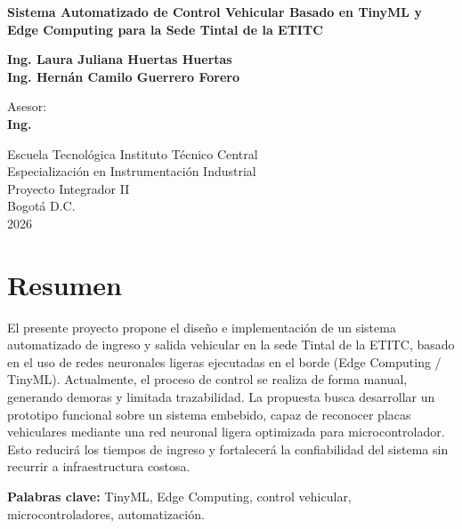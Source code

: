 \documentclass[12pt, letterpaper]{article}
\begin{document}
\begin{titlepage}
    \centering
    \vspace*{2cm}
    
    {\Large \textbf{Sistema Automatizado de Control Vehicular Basado en TinyML y Edge Computing para la Sede Tintal de la ETITC}\par}
    
    \vspace{4cm}
    
    {\large \textbf{Ing. Laura Juliana Huertas Huertas}\\
    \textbf{Ing. Hernán Camilo Guerrero Forero}\par}
    
    \vspace{3cm}
    
    {\large Asesor:\\
    \textbf{Ing. }\par}
    
    \vfill
    
    {\large Escuela Tecnológica Instituto Técnico Central\\
    Especialización en Instrumentación Industrial\\
    Proyecto Integrador II\\
    Bogotá D.C.\\
    2026\par}
\end{titlepage}

\newpage
\section*{Resumen}
El presente proyecto propone el diseño e implementación de un sistema automatizado de ingreso y salida vehicular en la sede Tintal de la ETITC, basado en el uso de redes neuronales ligeras ejecutadas en el borde (Edge Computing / TinyML). Actualmente, el proceso de control se realiza de forma manual, generando demoras y limitada trazabilidad. La propuesta busca desarrollar un prototipo funcional sobre un sistema embebido, capaz de reconocer placas vehiculares mediante una red neuronal ligera optimizada para microcontrolador. Esto reducirá los tiempos de ingreso y fortalecerá la confiabilidad del sistema sin recurrir a infraestructura costosa.

\vspace{0.5cm}
\noindent \textbf{Palabras clave:} TinyML, Edge Computing, control vehicular, microcontroladores, automatización.
\end{document}
